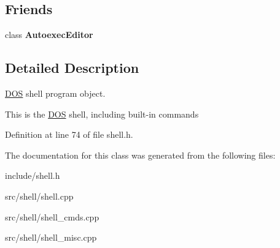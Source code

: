 \subsection*{Friends}
\begin{DoxyCompactItemize}
\item 
\hypertarget{classDOS__Shell_abca6adc7a2081b5b03c267fdae1d0b8d}{class {\bfseries Autoexec\-Editor}}\label{classDOS__Shell_abca6adc7a2081b5b03c267fdae1d0b8d}

\end{DoxyCompactItemize}


\subsection{Detailed Description}
\hyperlink{classDOS}{D\-O\-S} shell program object. 

This is the \hyperlink{classDOS}{D\-O\-S} shell, including built-\/in commands 

Definition at line 74 of file shell.\-h.



The documentation for this class was generated from the following files\-:\begin{DoxyCompactItemize}
\item 
include/shell.\-h\item 
src/shell/shell.\-cpp\item 
src/shell/shell\-\_\-cmds.\-cpp\item 
src/shell/shell\-\_\-misc.\-cpp\end{DoxyCompactItemize}
